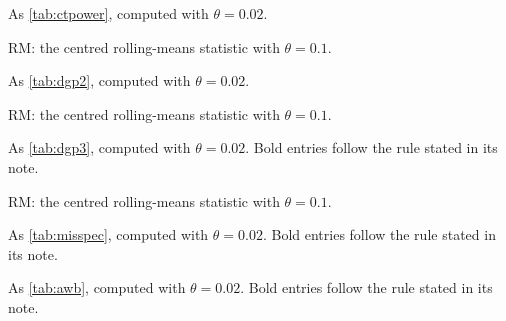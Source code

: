\documentclass[11pt]{article}
\begin{document}
\begin{table}[htbp]
\centering
\caption{As \cref{tab:ctpower}, computed with $\theta = 0.02$.}
\label{tab:ctpower02}
\small
\begin{adjustbox}{max width=\textwidth}

\end{adjustbox}
\par\medskip\begin{minipage}{\textwidth}\footnotesize
RM: the centred rolling-means statistic with $\theta = 0.1$.
\end{minipage}
\end{table}

\begin{table}[htbp]
\centering
\caption{As \cref{tab:dgp2}, computed with $\theta = 0.02$.}
\label{tab:dgp202}
\small
\begin{adjustbox}{max width=\textwidth}

\end{adjustbox}
\par\medskip\begin{minipage}{\textwidth}\footnotesize
RM: the centred rolling-means statistic with $\theta = 0.1$.
\end{minipage}
\end{table}

\begin{table}[htbp]
\centering
\caption{As \cref{tab:dgp3}, computed with $\theta = 0.02$. Bold entries follow the rule stated in its note.}
\label{tab:dgp302}
\small
\begin{adjustbox}{max width=\textwidth}

\end{adjustbox}
\par\medskip\begin{minipage}{\textwidth}\footnotesize
RM: the centred rolling-means statistic with $\theta = 0.1$.
\end{minipage}
\end{table}

\begin{table}[htbp]
\centering
\caption{As \cref{tab:misspec}, computed with $\theta = 0.02$. Bold entries follow the rule stated in its note.}
\label{tab:misspec02}
\small
\begin{adjustbox}{max width=\textwidth}

\end{adjustbox}
\end{table}

\begin{table}[htbp]
\centering
\caption{As \cref{tab:awb}, computed with $\theta = 0.02$. Bold entries follow the rule stated in its note.}
\label{tab:awb02}
\small
\begin{adjustbox}{max width=\textwidth}

\end{adjustbox}
\end{table}
\end{document}
